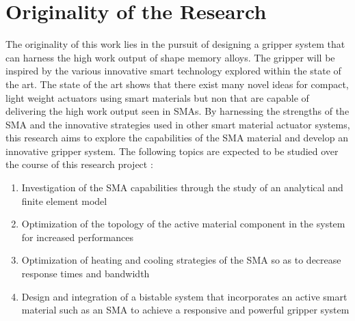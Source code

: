 \section{Originality of the Research} \label{sec:originality}
The originality of this work lies in the pursuit of designing a gripper system that can harness the high work output of shape memory alloys. The gripper will be inspired by the various innovative smart technology explored within the state of the art. The state of the art shows that there exist many novel ideas for compact, light weight actuators using smart materials but non that are capable of delivering the high work output seen in SMAs. By harnessing the strengths of the SMA and the innovative strategies used in other smart material actuator systems, this research aims to explore the capabilities of the SMA material and develop an innovative gripper system. The following topics are expected to be studied over the course of this research project :
\begin{enumerate}
  \item Investigation of the SMA capabilities through the study of an analytical and finite element model
  \item Optimization of the topology of the active material component in the system for increased performances
  \item Optimization of heating and cooling strategies of the SMA so as to decrease response times and bandwidth
  \item Design and integration of a bistable system that incorporates an active smart material such as an SMA to achieve a responsive and powerful gripper system
\end{enumerate}
